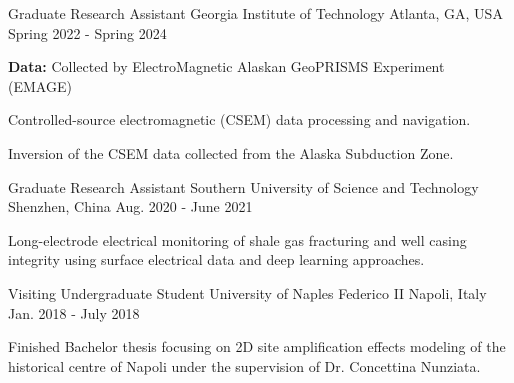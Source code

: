 

\begin{cventries}

  \cventry
    {Graduate Research Assistant} %
    {Georgia Institute of Technology} %
    {Atlanta, GA, USA} %
    {Spring 2022 - Spring 2024} %
    {
      \begin{cvitems}
        \item {\textbf{Data:} Collected by ElectroMagnetic Alaskan GeoPRISMS Experiment (EMAGE)}
        \item {Controlled-source electromagnetic (CSEM) data processing and navigation.}
        \item {Inversion of the CSEM data collected from the Alaska Subduction Zone.}
      \end{cvitems}
    }

  \cventry
    {Graduate Research Assistant} %
    {Southern University of Science and Technology} %
    {Shenzhen, China} %
    {Aug. 2020 - June 2021} %
    {
      \begin{cvitems} %
        \item {Long-electrode electrical monitoring of shale gas fracturing and well casing integrity using surface electrical data and deep learning approaches.}
      \end{cvitems}
    }

  \cventry
    {Visiting Undergraduate Student} %
    {University of Naples Federico II} %
    {Napoli, Italy} %
    {Jan. 2018 - July 2018} %
    {
      \begin{cvitems} %
        \item {Finished Bachelor thesis focusing on 2D site amplification effects modeling of the historical centre of Napoli under the supervision of Dr. Concettina Nunziata.}
      \end{cvitems}
    }

\end{cventries}
